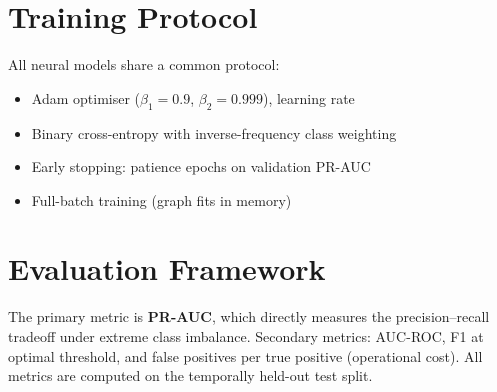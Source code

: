 \section{Training Protocol}
\label{sec:training-protocol}

All neural models share a common protocol:
\begin{itemize}[nosep]
  \item Adam optimiser ($\beta_1 = 0.9$, $\beta_2 = 0.999$), learning rate 
  \item Binary cross-entropy with inverse-frequency class weighting
  \item Early stopping: patience  epochs on validation PR-AUC
  \item Full-batch training (graph fits in memory)
\end{itemize}

\section{Evaluation Framework}
\label{sec:eval-framework}

The primary metric is \textbf{PR-AUC}, which directly measures the precision--recall tradeoff under extreme class imbalance. Secondary metrics: AUC-ROC, F1 at optimal threshold, and false positives per true positive (operational cost). All metrics are computed on the temporally held-out test split.
